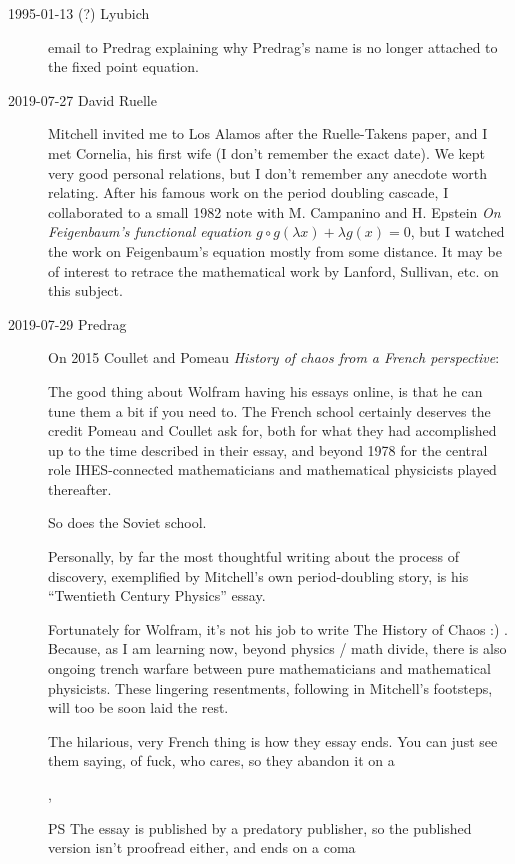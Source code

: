 \begin{description}
\item[1995-01-13 (?) Lyubich]
email to Predrag explaining why Predrag's name is no longer attached
to the fixed point equation.

\item[2019-07-27 David Ruelle] %
Mitchell invited me to Los Alamos after the Ruelle-Takens paper, and I
met Cornelia, his first wife (I don't remember the exact date).  We kept
very good personal relations, but I don't remember any anecdote worth
relating.  After his famous work on the period doubling cascade, I
collaborated to a small 1982 note with M. Campanino and H.
Epstein {\em On {Feigenbaum}'s functional equation {$g \circ
g(\lambda x) + \lambda g(x) = 0$}}, but I watched the work on
Feigenbaum's equation mostly from some distance.  It may be of interest
to retrace the mathematical work by Lanford, Sullivan, etc. on this
subject.


\item[2019-07-29 Predrag]
On 2015 Coullet and Pomeau
{\em History of chaos from a {French} perspective}:

The good thing about Wolfram having his essays online, is that he can
tune them a bit if you need to. The French school certainly deserves the
credit Pomeau and Coullet ask for, both for what they had accomplished up
to the time described in their essay, and beyond 1978 for the central
role IHES-connected mathematicians and mathematical physicists played
thereafter.

So does the Soviet school.

Personally, by far the most thoughtful writing about the process of
discovery, exemplified by Mitchell's own period-doubling story, is his
``Twentieth Century Physics'' essay.

Fortunately for Wolfram, it's not his job to write The History of Chaos
:) . Because, as I am learning now, beyond physics / math divide, there
is also ongoing trench warfare between pure mathematicians and
mathematical physicists. These lingering resentments, following in
Mitchell's footsteps, will too be soon laid the rest.

The hilarious, very French thing is how they essay ends. You can just see
them saying, of fuck, who cares, so they abandon it on a %

,

\medskip

PS The essay is published by a predatory publisher, so the published
version isn't proofread either, and ends on a coma


\end{description}

